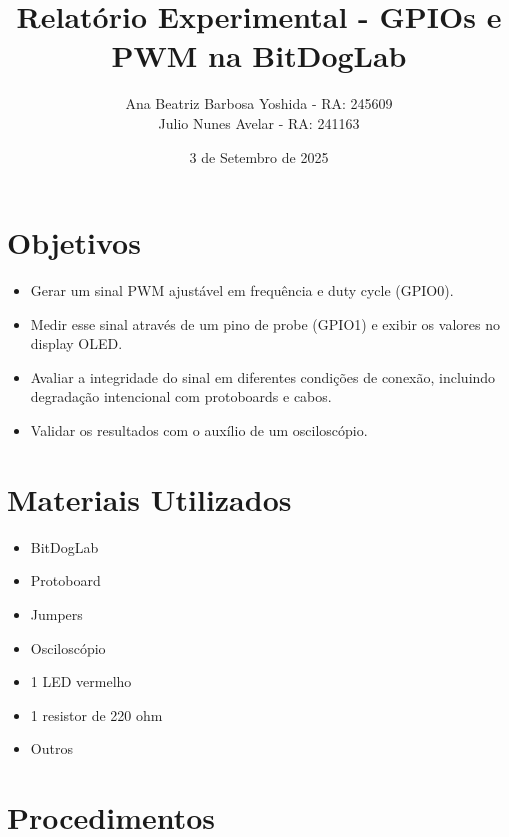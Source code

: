 \documentclass{article}
\title{Relatório Experimental - GPIOs e PWM na BitDogLab}
\author{Ana Beatriz Barbosa Yoshida - RA: 245609 \\ Julio Nunes Avelar - RA: 241163}
\date{3 de Setembro de 2025}
\begin{document}
\maketitle

\section{Objetivos}
\begin{itemize}
    \item Gerar um sinal PWM ajustável em frequência e duty cycle (GPIO0).
    \item Medir esse sinal através de um pino de probe (GPIO1) e exibir os valores no display OLED.
    \item Avaliar a integridade do sinal em diferentes condições de conexão, incluindo degradação intencional com protoboards e cabos.
    \item Validar os resultados com o auxílio de um osciloscópio.
\end{itemize}

\section{Materiais Utilizados}
\begin{itemize}
    \item BitDogLab
    \item Protoboard
    \item Jumpers
    \item Osciloscópio
    \item 1 LED vermelho
    \item 1 resistor de 220 ohm
    \item Outros
\end{itemize}

\section{Procedimentos}
\end{document}

